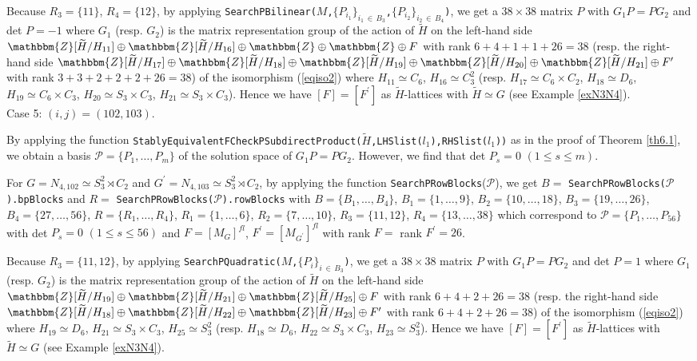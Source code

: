 \documentclass{amsart}
\theoremstyle{plain}
\theoremstyle{definition}
\theoremstyle{remark}
\newcommand{\bZ}{\mathbbm{Z}}\newcommand{\bQ}{\mathbbm{Q}}
\begin{document}
Because $R_3=\{11\}$, $R_4=\{12\}$, 
by applying 
{\tt SearchPBilinear($M$,$\{P_{i_1}\}_{i_1\,\in\, B_3}$,$\{P_{i_2}\}_{i_2\,\in\, B_4}$)}, 
we get a $38\times 38$ matrix $P$ with $G_1P=PG_2$ and det $P=-1$ 
where $G_1$ (resp. $G_2$) 
is the matrix representation group of the action of 
$\widetilde{H}$ on the left-hand side 
$\bZ[\widetilde{H}/H_{11}]\oplus \bZ[\widetilde{H}/H_{16}]\oplus 
\bZ\oplus \bZ\oplus F$ with rank $6+4+1+1+26=38$ 
(resp. the right-hand side $
\bZ[\widetilde{H}/H_{17}]\oplus 
\bZ[\widetilde{H}/H_{18}]\oplus 
\bZ[\widetilde{H}/H_{19}]\oplus 
\bZ[\widetilde{H}/H_{20}]\oplus 
\bZ[\widetilde{H}/H_{21}]\oplus 
F^\prime$ with rank $3+3+2+2+2+26=38$) 
of the isomorphism (\ref{eqiso2}) where 
$H_{11}\simeq C_6$, 
$H_{16}\simeq C_3^2$ 
(resp. 
$H_{17}\simeq C_6\times C_2$, 
$H_{18}\simeq D_6$, 
$H_{19}\simeq C_6\times C_3$, 
$H_{20}\simeq S_3\times C_3$, 
$H_{21}\simeq S_3\times C_3$). 
Hence we have $[F]=[F^\prime]$ as 
$\widetilde{H}$-lattices with $\widetilde{H}\simeq G$ 
(see Example \ref{exN3N4}).\\

Case 5: $(i,j)=(102,103)$. 

By applying the function 
{\tt StablyEquivalentFCheckPSubdirectProduct($\widetilde{H}$,LHSlist($l_1$),RHSlist($l_1$))} as in the proof of Theorem \ref{th6.1}, 
we obtain a basis 
$\mathcal{P}=\{P_1,\dots,P_m\}$ of the solution space of $G_1P=PG_2$. 
However, we find that det $P_s=0$ $(1\leq s\leq m)$. 

For $G=N_{4,102}\simeq S_3^2\rtimes C_2$ and 
$G^\prime=N_{4,103}\simeq S_3^2\rtimes C_2$, 
by applying the function {\tt SearchPRowBlocks}($\mathcal{P}$), 
we get 
$B=$ {\tt SearchPRowBlocks($\mathcal{P}$).bpBlocks} 
and 
$R=$ {\tt SearchPRowBlocks($\mathcal{P}$).rowBlocks} 
with $B=\{B_1,\ldots,B_4\}$, 
$B_1=\{1,\ldots,9\}$, $B_2=\{10,\ldots,18\}$, 
$B_3=\{19,\ldots,26\}$, $B_4=\{27,\ldots,56\}$, 
$R=\{R_1,\ldots,R_4\}$, 
$R_1=\{1,\ldots,6\}$, $R_2=\{7,\ldots,10\}$,
$R_3=\{11,12\}$, $R_4=\{13,\ldots,38\}$ 
which correspond to 
$\mathcal{P}=\{P_1,\ldots,P_{56}\}$ with 
det $P_s=0$ $(1\leq s\leq 56)$ and 
$F=[M_G]^{fl}$, $F^\prime=[M_{G^\prime}]^{fl}$ 
with rank $F=$ rank $F^\prime=26$. 

Because $R_3=\{11,12\}$, 
by applying 
{\tt SearchPQuadratic($M$,$\{P_i\}_{i\,\in\, B_3}$)}, 
we get a $38\times 38$ matrix $P$ with $G_1P=PG_2$ and det $P=1$ 
where $G_1$ (resp. $G_2$) 
is the matrix representation group of the action of 
$\widetilde{H}$ on the left-hand side 
$\bZ[\widetilde{H}/H_{19}]\oplus \bZ[\widetilde{H}/H_{21}]\oplus 
\bZ[\widetilde{H}/H_{25}]\oplus F$ with rank $6+4+2+26=38$ 
(resp. the right-hand side $
\bZ[\widetilde{H}/H_{18}]\oplus 
\bZ[\widetilde{H}/H_{22}]\oplus 
\bZ[\widetilde{H}/H_{23}]\oplus 
F^\prime$ with rank $6+4+2+26=38$) of the isomorphism (\ref{eqiso2}) 
where 
$H_{19}\simeq D_6$, 
$H_{21}\simeq S_3\times C_3$, 
$H_{25}\simeq S_3^2$ 
(resp. 
$H_{18}\simeq D_6$, 
$H_{22}\simeq S_3\times C_3$, 
$H_{23}\simeq S_3^2$). 
Hence we have $[F]=[F^\prime]$ as 
$\widetilde{H}$-lattices with $\widetilde{H}\simeq G$ 
(see Example \ref{exN3N4}).\\
\end{document}
